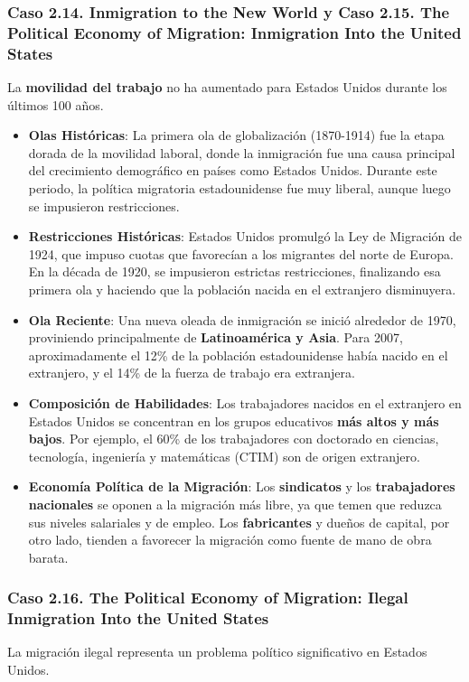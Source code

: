 \subsubsection{Caso 2.14. Inmigration to the New World y Caso 2.15. The Political Economy of Migration: Inmigration Into the United States}
La \textbf{movilidad del trabajo} no ha aumentado para Estados Unidos durante los últimos 100 años.

\begin{itemize}
    \item \textbf{Olas Históricas}: La primera ola de globalización (1870-1914) fue la etapa dorada de la movilidad laboral, donde la inmigración fue una causa principal del crecimiento demográfico en países como Estados Unidos. Durante este periodo, la política migratoria estadounidense fue muy liberal, aunque luego se impusieron restricciones.
    \item \textbf{Restricciones Históricas}: Estados Unidos promulgó la Ley de Migración de 1924, que impuso cuotas que favorecían a los migrantes del norte de Europa. En la década de 1920, se impusieron estrictas restricciones, finalizando esa primera ola y haciendo que la población nacida en el extranjero disminuyera.
    \item \textbf{Ola Reciente}: Una nueva oleada de inmigración se inició alrededor de 1970, proviniendo principalmente de \textbf{Latinoamérica y Asia}. Para 2007, aproximadamente el 12\% de la población estadounidense había nacido en el extranjero, y el 14\% de la fuerza de trabajo era extranjera.
    \item \textbf{Composición de Habilidades}: Los trabajadores nacidos en el extranjero en Estados Unidos se concentran en los grupos educativos \textbf{más altos y más bajos}. Por ejemplo, el 60\% de los trabajadores con doctorado en ciencias, tecnología, ingeniería y matemáticas (CTIM) son de origen extranjero.
    \item \textbf{Economía Política de la Migración}: Los \textbf{sindicatos} y los \textbf{trabajadores nacionales} se oponen a la migración más libre, ya que temen que reduzca sus niveles salariales y de empleo. Los \textbf{fabricantes} y dueños de capital, por otro lado, tienden a favorecer la migración como fuente de mano de obra barata.
\end{itemize}

\subsubsection{Caso 2.16. The Political Economy of Migration: Ilegal Inmigration Into the United States}
La migración ilegal representa un problema político significativo en Estados Unidos.

